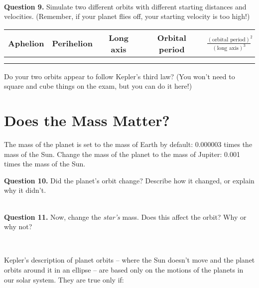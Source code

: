 \documentclass[11pt]{article}
\begin{document}
\vspace{1.5cm}
\hrulefill\\

\textbf{Question 9.} Simulate two different orbits with different starting distances and velocities. (Remember, if your planet flies off, your starting velocity is too high!)

\begin{center}
\Large
\begin{tabular}{| c | c | c | c | c |}
	\hline
	Aphelion & Perihelion & Long axis & Orbital period & $\frac{(\mbox{orbital period})^2}{(\mbox{long axis})^3}$ \\
	\hline
	& & & & \\[1.2cm]
	\hline
	& & & & \\[1.2cm]
	\hline
	\end{tabular}
\end{center}

Do your two orbits appear to follow Kepler's third law? (You won't need to square and cube things on the exam, but you can do it here!)

\newpage

\section{Does the Mass Matter?}

The mass of the planet is set to the mass of Earth by default: 0.000003 times the mass of the Sun. Change the mass of the planet to the mass of Jupiter: 0.001 times the mass of the Sun. 

\textbf{Question 10.} Did the planet's orbit change? Describe how it changed, or explain why it didn't.

\vspace{1.5cm}

\hrulefill\\

\textbf{Question 11.} Now, change the {\it star's} mass. Does this affect the orbit? Why or why not?

\vspace{1.5cm}

\hrulefill\\

\vspace{3em}

Kepler's description of planet orbits -- where the Sun doesn't move and the planet orbits around it in an ellipse -- are based only on the motions of the planets in our solar system. They are true only if:
\end{document}
